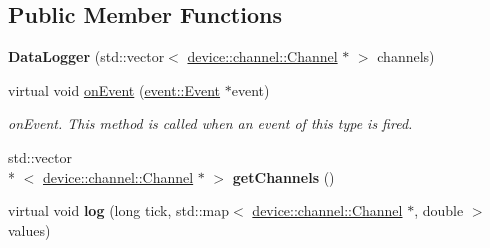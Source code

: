 \subsection*{Public Member Functions}
\begin{DoxyCompactItemize}
\item 
\hypertarget{classdrobot_1_1datalogger_1_1DataLogger_ad7afd9487ac37f503ebe9159872a79dc}{{\bfseries Data\-Logger} (std\-::vector$<$ \hyperlink{classdrobot_1_1device_1_1channel_1_1Channel}{device\-::channel\-::\-Channel} $\ast$ $>$ channels)}\label{classdrobot_1_1datalogger_1_1DataLogger_ad7afd9487ac37f503ebe9159872a79dc}

\item 
virtual void \hyperlink{classdrobot_1_1datalogger_1_1DataLogger_a830fcb8f0b8b261bba22cfce46f4d309}{on\-Event} (\hyperlink{classdrobot_1_1event_1_1Event}{event\-::\-Event} $\ast$event)
\begin{DoxyCompactList}\small\item\em on\-Event. This method is called when an event of this type is fired. \end{DoxyCompactList}\item 
\hypertarget{classdrobot_1_1datalogger_1_1DataLogger_a96749bea55223e65aa2857dd9582f5ee}{std\-::vector\\*
$<$ \hyperlink{classdrobot_1_1device_1_1channel_1_1Channel}{device\-::channel\-::\-Channel} $\ast$ $>$ {\bfseries get\-Channels} ()}\label{classdrobot_1_1datalogger_1_1DataLogger_a96749bea55223e65aa2857dd9582f5ee}

\item 
\hypertarget{classdrobot_1_1datalogger_1_1DataLogger_a18e98de85b473a1e44e6f6793417b7b2}{virtual void {\bfseries log} (long tick, std\-::map$<$ \hyperlink{classdrobot_1_1device_1_1channel_1_1Channel}{device\-::channel\-::\-Channel} $\ast$, double $>$ values)}\label{classdrobot_1_1datalogger_1_1DataLogger_a18e98de85b473a1e44e6f6793417b7b2}


\end{DoxyCompactItemize}
